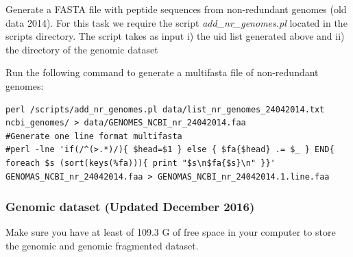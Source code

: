 \documentclass[12pt]{report}
\begin{document}
Generate a FASTA file with peptide sequences from non-redundant genomes (old
data 2014). 
For this task we require the script  \textit{add\_nr\_genomes.pl} located in
the scripts directory.
The script takes as input i) the uid list generated above and ii) the directory
of the genomic dataset 

Run the following command to generate a multifasta file of non-redundant
genomes:
\begin{verbatim}
perl /scripts/add_nr_genomes.pl data/list_nr_genomes_24042014.txt 
ncbi_genomes/ > data/GENOMES_NCBI_nr_24042014.faa
#Generate one line format multifasta 
#perl -lne 'if(/^(>.*)/){ $head=$1 } else { $fa{$head} .= $_ } END{ 
foreach $s (sort(keys(%fa))){ print "$s\n$fa{$s}\n" }}' 
GENOMAS_NCBI_nr_24042014.faa > GENOMAS_NCBI_nr_24042014.1.line.faa
\end{verbatim}

\subsubsection{Genomic dataset (Updated December 2016) }

Make sure you have at least of 109.3 G of free space in your computer to store
the genomic and genomic fragmented dataset. 
\end{document}
